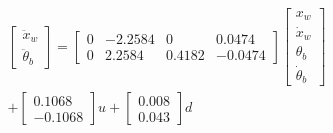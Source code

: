 \documentclass[11pt]{article} %
\begin{document}
\begin{enumerate}
\begin{equation*}
\begin{aligned}
\begin{bmatrix}
        \ddot{x}_w \\
        \ddot{\theta}_b
      \end{bmatrix}
      =
      \begin{bmatrix}
        0 & -2.2584 & 0 & 0.0474 \\
        0 & 2.2584 & 0.4182 & -0.0474
      \end{bmatrix}
      \begin{bmatrix}
        x_w\\
        \dot{x}_w\\
        \theta_b\\
        \dot{\theta}_b
      \end{bmatrix}
      \\
      +
      \begin{bmatrix}
        0.1068 \\
        -0.1068
      \end{bmatrix}
      u
      +
      \begin{bmatrix}
        0.008 \\
        0.043
      \end{bmatrix}
      d
    \end{aligned}
  \end{equation*}
\end{enumerate}
\end{document}
